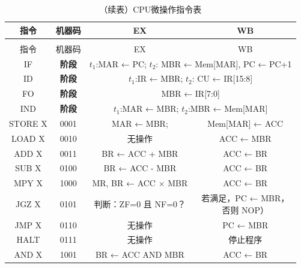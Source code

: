 \documentclass[lang=cn,a4paper,newtx]{elegantpaper}
\begin{document}
\begin{longtable}{cccc}
  \caption{CPU微操作指令表} \label{tab:five_stage_pipeline}\\
  \toprule
  指令 & 机器码  & EX & WB \\
  \midrule
  \endfirsthead

  \toprule
  \caption[]{（续表）CPU微操作指令表} \\
  \toprule
  指令 & 机器码 & EX & WB \\
  \midrule
  \endhead

  \bottomrule
  \endlastfoot
  \rowcolor{red!10}
  IF & \textbf{阶段} & \multicolumn{2}{c}{$t_1$:MAR ← PC; $t_2$: MBR ← Mem[MAR], PC ← PC+1} \\
  \midrule
  \rowcolor{yellow!10}
  ID & \textbf{阶段} & \multicolumn{2}{c}{$t_1$:IR ← MBR; $t_2$: CU ← IR[15:8]}\\
  \midrule
  \rowcolor{blue!10}
  FO & \textbf{阶段} & \multicolumn{2}{c}{MBR ← IR[7:0]} \\
  \midrule
  \rowcolor{green!10}
  
  IND & \textbf{阶段} & \multicolumn{2}{c}{$t_1$:MAR ← MBR;  $t_2$:MBR ← Mem[MAR]}\\
  \midrule
  STORE X & 0001  & MAR ← MBR; & Mem[MAR] ← ACC \\

  LOAD X & 0010 &
  无操作 & 
  ACC ← MBR \\
  \midrule
  ADD X & 0011 &
  
  BR ← ACC + MBR & 
  ACC ← BR \\

  SUB X & 0100 &
  
  BR ← ACC - MBR & 
  ACC ← BR \\
  MPY X & 1000 &
  
  MR, BR ← ACC × MBR &
  ACC ← BR \\
  \midrule
  JGZ X & 0101 &
   
  判断：ZF=0 且 NF=0？ & 
  \makecell{若满足，PC ← MBR，\\否则 NOP）} \\

  JMP X & 0110 &
  
  无操作 & 
  PC ← MBR \\

  HALT & 0111 &
  
  无操作 & 
  停止程序 \\

  
  \midrule
  AND X & 1001 &
  
  BR ← ACC AND MBR &
  ACC ← BR \\


\end{longtable}
\end{document}
